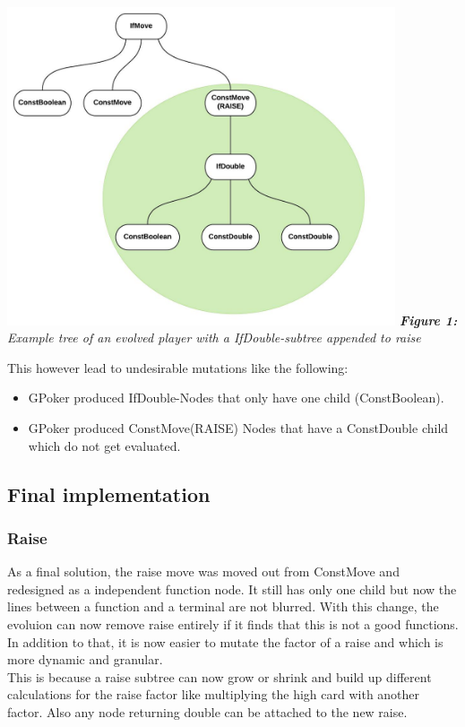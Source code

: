 \documentclass[12pt,fleqn,a4paper]{article}
\begin{document}
\begin{center}
	\includegraphics[width=0.86\textwidth]{raise_subtree_1.png}
	\textit{\textbf{Figure 1: }Example tree of an evolved player with a IfDouble-subtree appended to raise} 
\end{center}

This however lead to undesirable mutations like the following:
\begin{itemize}
	\item GPoker produced IfDouble-Nodes that only have one child
	(ConstBoolean).
	\item GPoker produced ConstMove(RAISE) Nodes that have a
	ConstDouble child which do not get evaluated.
\end{itemize}

\newpage
\subsection{Final implementation}
\subsubsection{Raise}
As a final solution, the raise move was moved out from ConstMove and redesigned as a independent function node. It still has only one child but now the lines between a function and a terminal are not blurred. With this change, the evoluion can now remove raise entirely if it finds that this is not a good functions. In addition to that, it is now easier to mutate the factor of a raise and which is more dynamic and granular. \\
This is because a raise subtree can now grow or shrink and build up different calculations for the raise factor like multiplying the high card with another factor. Also any node returning double can be attached to the new raise.
\end{document}
